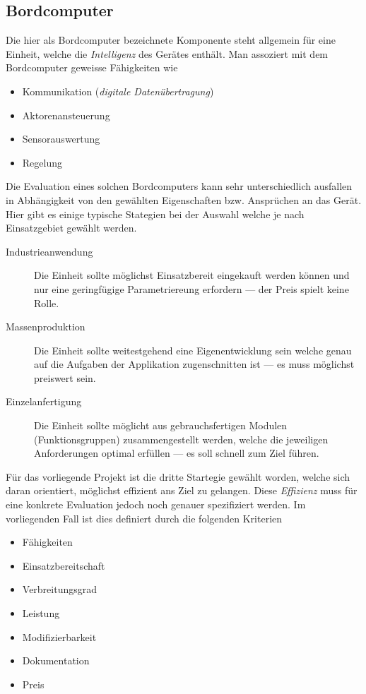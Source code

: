 \subsection{Bordcomputer}
Die hier als Bordcomputer bezeichnete Komponente steht allgemein für eine
Einheit, welche die \emph{Intelligenz} des Gerätes enthält. Man assoziert
mit dem Bordcomputer geweisse Fähigkeiten wie
\begin{itemize}
	\item Kommunikation (\emph{digitale Datenübertragung})
	\item Aktorenansteuerung
	\item Sensorauswertung
	\item Regelung
\end{itemize}

Die Evaluation eines solchen Bordcomputers kann sehr unterschiedlich 
ausfallen in Abhängigkeit von den gewählten Eigenschaften bzw. 
Ansprüchen an das Gerät. Hier gibt es einige typische Stategien bei der
Auswahl welche je nach Einsatzgebiet gewählt werden.
\begin{description}
	\item[Industrieanwendung] Die Einheit sollte möglichst 
		Einsatzbereit eingekauft werden können und nur eine 
		geringfügige Parametriereung erfordern --- der Preis 
		spielt keine Rolle.
	\item[Massenproduktion] Die Einheit sollte weitestgehend eine
		Eigenentwicklung sein welche genau auf die Aufgaben
		der Applikation zugenschnitten ist --- es muss möglichst
		preiswert sein.
	\item[Einzelanfertigung] Die Einheit sollte möglicht aus 
		gebrauchsfertigen Modulen (Funktionsgruppen) 
		zusammengestellt werden, welche die jeweiligen 
		Anforderungen optimal erfüllen --- es soll schnell zum
		Ziel führen.
\end{description}

Für das vorliegende Projekt ist die dritte Startegie gewählt worden, 
welche sich daran orientiert, möglichst effizient ans Ziel zu gelangen.
Diese \emph{Effizienz} muss für eine konkrete Evaluation jedoch noch
genauer spezifiziert werden. Im vorliegenden Fall ist dies definiert
durch die folgenden Kriterien

\begin{itemize}
	\item Fähigkeiten
	\item Einsatzbereitschaft
	\item Verbreitungsgrad
	\item Leistung
	\item Modifizierbarkeit
	\item Dokumentation
	\item Preis
\end{itemize}

